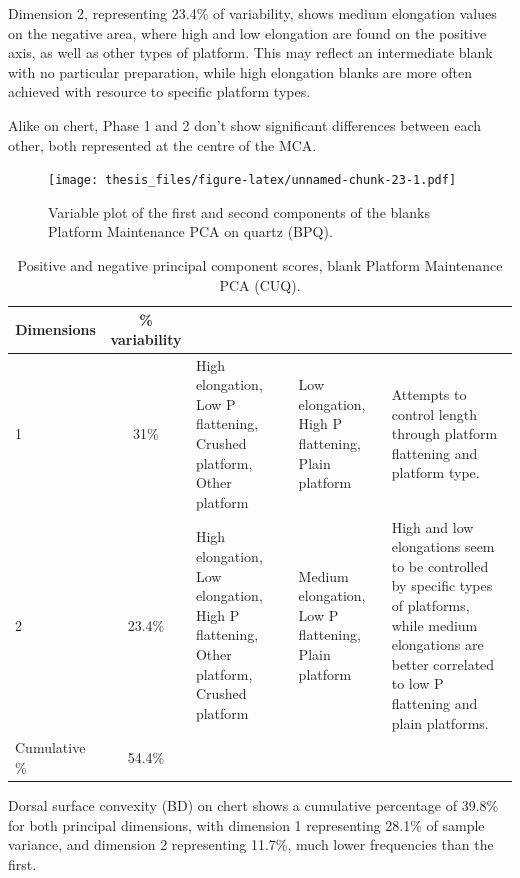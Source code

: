 \documentclass[12pt,twoside]{reedthesis}
\begin{document}
Dimension 2, representing 23.4\% of variability, shows medium elongation values on the negative area, where high and low elongation are found on the positive axis, as well as other types of platform. This may reflect an intermediate blank with no particular preparation, while high elongation blanks are more often achieved with resource to specific platform types.

Alike on chert, Phase 1 and 2 don't show significant differences between each other, both represented at the centre of the MCA.
\begin{figure}
\centering
\texttt{[image: thesis\_files/figure-latex/unnamed-chunk-23-1.pdf]}
\caption{\label{fig:unnamed-chunk-23}Variable plot of the first and second components of the blanks Platform Maintenance PCA on quartz (BPQ).}
\end{figure}
\begin{table}[!h]

\caption{\label{tab:unnamed-chunk-24}Positive and negative principal component scores, blank Platform Maintenance PCA (CUQ).}
\centering
\begin{tabular}[t]{lc>{\raggedright\arraybackslash}p{3cm}>{\raggedright\arraybackslash}p{3cm}>{\raggedright\arraybackslash}p{3cm}}
\toprule
\multicolumn{1}{c}{\textbf{Dimensions}} & \multicolumn{1}{c}{\textbf{\% variability}} & \multicolumn{1}{>{\centering\arraybackslash}p{3cm}}{\textbf{+}} & \multicolumn{1}{>{\centering\arraybackslash}p{3cm}}{\textbf{-}} & \multicolumn{1}{>{\centering\arraybackslash}p{3cm}}{\textbf{Interpretation}}\\
\midrule
1 & 31\% & High elongation, Low P flattening, Crushed platform, Other platform & Low elongation, High P flattening, Plain platform & Attempts to control length through platform flattening and platform type.\\
2 & 23.4\% & High elongation, Low elongation, High P flattening, Other platform, Crushed platform & Medium elongation, Low P flattening, Plain platform & High and low elongations seem to be controlled by specific types of platforms, while medium elongations are better correlated to low P flattening and plain platforms.\\
Cumulative \% & 54.4\% &  &  & \\
\bottomrule
\end{tabular}
\end{table}
Dorsal surface convexity (BD) on chert shows a cumulative percentage of 39.8\% for both principal dimensions, with dimension 1 representing 28.1\% of sample variance, and dimension 2 representing 11.7\%, much lower frequencies than the first.
\end{document}
